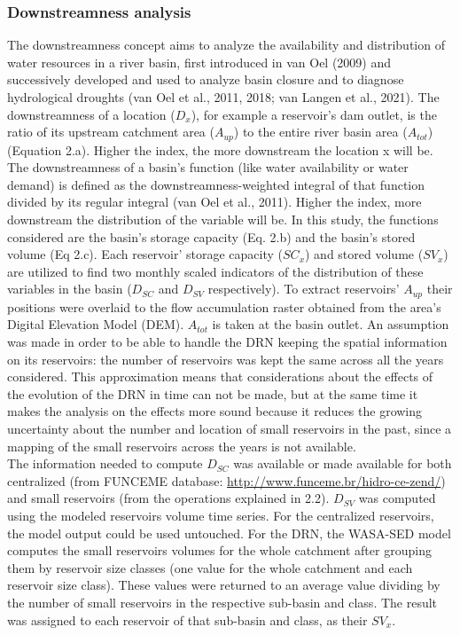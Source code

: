 \documentclass[draft]{agujournal2019}
\begin{document}
\subsubsection{Downstreamness analysis}
The downstreamness concept aims to analyze the availability and distribution of water resources in a river basin, first introduced in van Oel (2009) and successively developed and used to analyze basin closure and to diagnose hydrological droughts (van Oel et al., 2011, 2018; van Langen et al., 2021). The downstreamness of a location ($D_{x}$), for example a reservoir’s dam outlet, is the ratio of its upstream catchment area ($A_{up}$) to the entire river basin area ($A_{tot}$) (Equation 2.a). Higher the index, the more downstream the location x will be.\\
The downstreamness of a basin’s function (like water availability or water demand) is defined as the downstreamness-weighted integral of that function divided by its regular integral (van Oel et al., 2011). Higher the index, more downstream the distribution of the variable will be. In this study, the functions considered are the basin’s storage capacity (Eq. 2.b) and the basin’s stored volume (Eq 2.c). Each reservoir’ storage capacity ($SC_{x}$) and stored volume ($SV_{x}$) are utilized to find two monthly scaled indicators of the distribution of these variables in the basin ($D_{SC}$ and $D_{SV}$ respectively). To extract reservoirs’ $A_{up}$ their positions were overlaid to the flow accumulation raster obtained from the area’s Digital Elevation Model (DEM). $A_{tot}$ is taken at the basin outlet.  An assumption was made in order to be able to handle the DRN keeping the spatial information on its reservoirs: the number of reservoirs was kept the same across all the years considered. This approximation means that considerations about the effects of the evolution of the DRN in time can not be made, but at the same time it makes the analysis on the effects more sound because it reduces the growing uncertainty about the number and location of small reservoirs in the past, since a mapping of the small reservoirs across the years is not available.\\
The information needed to compute $D_{SC}$ was available or made available for both centralized (from FUNCEME database: \url{http://www.funceme.br/hidro-ce-zend/}) and small reservoirs (from the operations explained in 2.2). $D_{SV}$ was computed using the modeled reservoirs volume time series. For the centralized reservoirs, the model output could be used untouched. For the DRN, the WASA-SED model computes the small reservoirs volumes for the whole catchment after grouping them by reservoir size classes (one value for the whole catchment and each reservoir size class). These values were returned to an average value dividing by the number of small reservoirs in the respective sub-basin and class. The result was assigned to each reservoir of that sub-basin and class, as their $SV_{x}$.
\end{document}
